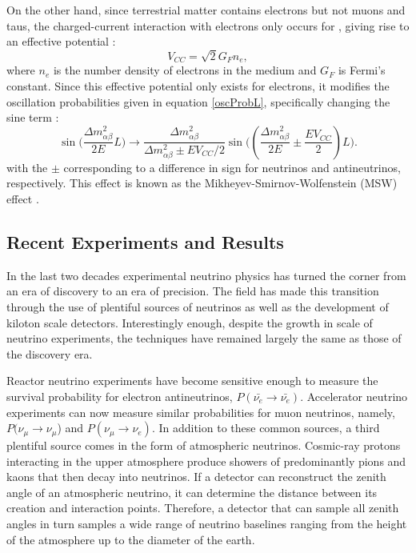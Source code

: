 On the other hand, since terrestrial matter contains electrons but not muons
and taus, the charged-current interaction with electrons only occurs for \nue,
giving rise to an effective potential \cite{ho2010elementary}:
\begin{equation}
\label{veff}
V_{CC} = \sqrt{2}G_F n_e,
\end{equation}
where $n_e$ is the number density of electrons in the medium and $G_F$ is
Fermi's constant.
Since this effective potential only exists for electrons, it modifies the
oscillation probabilities given in equation \eqref{oscProbL}, specifically
changing the sine term \cite{ho2010elementary}:
\begin{equation}
\label{modSin}
\sin\bigg(\frac{\Delta m_{\alpha\beta}^2}{2E}L\bigg) \rightarrow
\frac{\Delta m_{\alpha\beta}^2}{\Delta m_{\alpha\beta}^2 \pm E V_{CC}/2} \sin\bigg((\frac{\Delta m_{\alpha\beta}^2}{2E} \pm \frac{EV_{CC}}{2})L \bigg).
\end{equation}
with the $\pm$ corresponding to a difference in sign for neutrinos and
antineutrinos, respectively.
This effect is known as the Mikheyev-Smirnov-Wolfenstein (MSW) effect
\cite{wolfenstein1978neutrino}.

\subsection{Recent Experiments and Results}
In the last two decades experimental neutrino physics has turned the corner
from an era of discovery to an era of precision.
The field has made this transition through the use of plentiful sources of
neutrinos as well as the development of kiloton scale detectors.
Interestingly enough, despite the growth in scale of neutrino experiments, the
techniques have remained largely the same as those of the discovery era.

Reactor neutrino experiments \cite{kamland, dayaBay, reno} have become
sensitive enough to measure the survival probability for electron
antineutrinos, $P(\bar{\nu_e} \rightarrow \bar{\nu_e})$.
Accelerator neutrino experiments \cite{minos13,abe2014observation,nova2015nue}
can now
measure similar probabilities for muon neutrinos, namely,
$P(\nu_\mu \rightarrow \nu_\mu$) and $P(\nu_\mu \rightarrow \nu_e)$.
In addition to these common sources, a third plentiful source comes in the form
of atmospheric neutrinos.
Cosmic-ray protons interacting in the upper atmosphere produce showers of
predominantly pions and kaons that then decay into neutrinos.
If a detector can reconstruct the zenith angle of an atmospheric neutrino, it
can determine the distance between its creation and interaction points.
Therefore, a detector that can sample all zenith angles in turn samples a wide
range of neutrino baselines ranging from the height of the atmosphere up to the
diameter of the earth.

